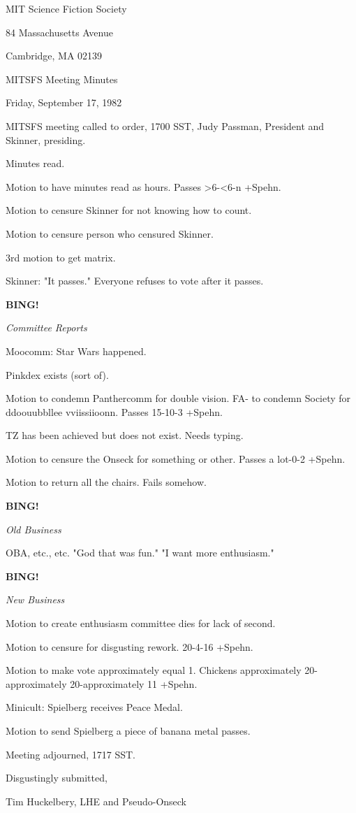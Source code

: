 \documentclass[12pt]{article}
\newcommand{\bing}{{\bf BING!} }
\newcommand{\goto}[1]{\bing \vskip 12pt \centerline{{\em{#1}}}}
\begin{document}
\begin{center}

MIT Science Fiction Society 

84 Massachusetts Avenue

Cambridge, MA 02139

\vspace{12pt}

MITSFS Meeting Minutes 

Friday, September 17, 1982

\end{center}
 
\vspace{18pt}

\setlength{\parskip}{6pt}

\noindent
MITSFS meeting called to order, 1700 SST,
Judy Passman, President and Skinner, presiding.

Minutes read.

Motion to have minutes read as hours. Passes >6-<6-n +Spehn.

Motion to censure Skinner for not knowing how to count.

Motion to censure person who censured Skinner.

3rd motion to get matrix.

Skinner: "It passes." Everyone refuses to vote after it passes.

\goto{Committee Reports}

Moocomm: Star Wars happened.

Pinkdex exists (sort of).

Motion to condemn Panthercomm for double vision. FA- to condemn Society for ddoouubbllee vviissiioonn. Passes 15-10-3 +Spehn.

TZ has been achieved but does not exist. Needs typing.

Motion to censure the Onseck for something or other. Passes a lot-0-2 +Spehn.

Motion to return all the chairs. Fails somehow.

\goto{Old Business}

OBA, etc., etc. "God that was fun." "I want more enthusiasm."

\goto{New Business}

Motion to create enthusiasm committee dies for lack of second.

Motion to censure for disgusting rework. 20-4-16 +Spehn.

Motion to make vote approximately equal 1. Chickens approximately 20-approximately 20-approximately 11 +Spehn.

Minicult: Spielberg receives Peace Medal.

Motion to send Spielberg a piece of banana metal passes.

\vspace{12pt}

\noindent
Meeting adjourned, 1717 SST.

\vspace{18pt}

\centerline{Disgustingly submitted,}
\centerline{Tim Huckelbery, LHE and Pseudo-Onseck}
\end{document}
